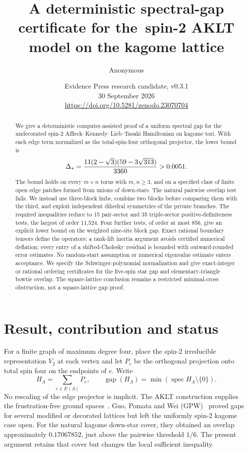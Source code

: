 \documentclass[11pt,a4paper]{article}
\title{A deterministic spectral-gap certificate for the\ spin-2 AKLT model on the kagome lattice}
\author{Anonymous}
\date{Evidence Press research candidate, v0.3.1\\30 September 2026\\\small\url{https://doi.org/10.5281/zenodo.23070704}}
\theoremstyle{remark}\newtheorem{remark}[theorem]{Remark}
\newcommand{\gap}{\operatorname{gap}}\newcommand{\ran}{\operatorname{ran}}
\newcommand{\spec}{\operatorname{spec}}\newcommand{\tr}{\operatorname{tr}}
\begin{document}
\maketitle
\begin{abstract}
We give a deterministic computer-assisted proof of a uniform spectral gap for the undecorated spin-2 Affleck--Kennedy--Lieb--Tasaki Hamiltonian on kagome tori. With each edge term normalized as the total-spin-four orthogonal projector, the lower bound is
\[
\Delta_*=\frac{11(2-\sqrt3)(59-3\sqrt{313})}{3360}>0.0051.
\]
The bound holds on every $m\times n$ torus with $m,n\ge3$, and on a specified class of finite open edge patches formed from unions of down-stars. The natural pairwise overlap test fails. We instead use three-block hubs, combine two blocks before comparing them with the third, and exploit independent dihedral symmetries of the private branches. The required inequalities reduce to 15 pair-sector and 35 triple-sector positive-definiteness tests, the largest of order 11,524. Four further tests, of order at most 856, give an explicit lower bound on the weighted nine-site block gap. Exact rational boundary tensors define the operators; a rank-lift inertia argument avoids certified numerical deflation; every entry of a shifted-Cholesky residual is bounded with outward-rounded error estimates. No random-start assumption or numerical eigenvalue estimate enters acceptance. We specify the Schwinger-polynomial normalization and give exact-integer or rational ordering certificates for the five-spin star gap and elementary-triangle bowtie overlap. The square-lattice conclusion remains a restricted minimal-cross obstruction, not a square-lattice gap proof.
\end{abstract}

\section{Result, contribution and status}
For a finite graph of maximum degree four, place the spin-2 irreducible representation $V_2$ at each vertex and let $P_e$ be the orthogonal projection onto total spin four on the endpoints of $e$. Write
\begin{equation}\label{eq:ham}
 H_\Lambda=\sum_{e\in E(\Lambda)}P_e,\qquad
 \gap(H_\Lambda)=\min(\spec H_\Lambda\setminus\{0\}).
\end{equation}
No rescaling of the edge projector is implicit. The AKLT construction supplies the frustration-free ground spaces~\cite{AKLT}. Guo, Pomata and Wei (GPW)~\cite{GPW} proved gaps for several modified or decorated lattices but left the uniformly spin-2 kagome case open. For the natural kagome down-star cover, they obtained an overlap approximately $0.17067852$, just above the pairwise threshold $1/6$. The present argument retains that cover but changes the local sufficient inequality.
\end{document}
